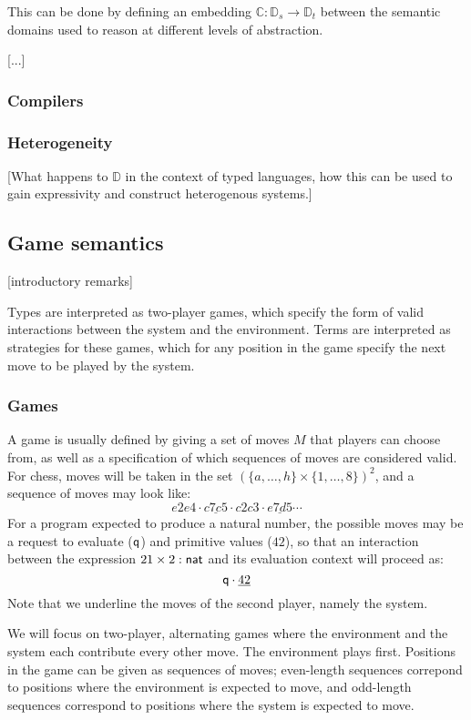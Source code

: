 This can be done by defining an embedding
$\mathbb{C} : \mathbb{D}_s \rightarrow \mathbb{D}_t$
between the semantic domains
used to reason at different levels of abstraction.

[...]

\subsubsection{Compilers}


\subsubsection{Heterogeneity}

[What happens to $\mathbb{D}$ in the context of typed languages,
how this can be used to gain expressivity and construct heterogenous systems.]


\subsection{Game semantics}

[introductory remarks]

Types are interpreted as two-player games,
which specify the form of valid interactions
between the system and the environment.
Terms are interpreted as strategies for these games,
which for any position in the game
specify the next move to be played by the system.

\subsubsection{Games}

A game is usually defined by giving a set of moves $M$
that players can choose from,
as well as a specification of which
sequences of moves are considered valid.
For chess,
moves will be taken in the set $(\{a, \ldots, h\} \times \{1, \ldots, 8\})^2$,
and a sequence of moves may look like:
\[ e2e4 \cdot \underline{c7c5} \cdot c2c3 \cdot \underline{e7d5} \cdots \]
For a program expected to produce a natural number,
the possible moves may be a request to evaluate ($ \mathsf{q} $)
and primitive values ($42$),
so that an interaction between the expression $21 \times 2 :  \mathsf{nat} $
and its evaluation context will proceed as:
\[  \mathsf{q}  \cdot \underline{42} \]
Note that we underline the moves of the second player,
namely the system.

We will focus on two-player, alternating games
where the environment and the system each contribute every other move.
The environment plays first.
Positions in the game can be given
as sequences of moves;
even-length sequences correpond to positions
where the environment is expected to move,
and odd-length sequences correspond to positions
where the system is expected to move.

